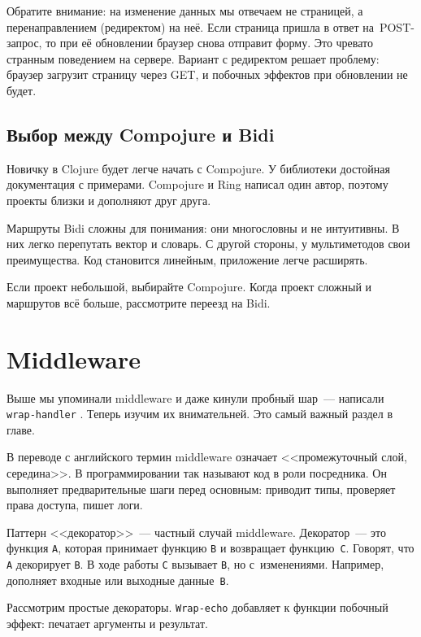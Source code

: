 Обратите внимание: на изменение данных мы отвечаем не страницей, а
перенаправлением (редиректом) на неё. Если страница пришла в ответ
на~POST-запрос, то при её обновлении браузер снова отправит форму. Это чревато
странным поведением на сервере. Вариант с редиректом решает проблему: браузер
загрузит страницу через GET, и побочных эффектов при обновлении не будет.

\subsection{Выбор между Compojure и Bidi}

Новичку в Clojure будет легче начать с Compojure. У библиотеки достойная
документация с примерами. Compojure и Ring написал один автор, поэтому проекты
близки и дополняют друг друга.

Маршруты Bidi сложны для понимания: они многословны и не интуитивны. В них легко
перепутать вектор и словарь. С другой стороны, у мультиметодов свои
преимущества. Код становится линейным, приложение легче расширять.

Если проект небольшой, выбирайте Compojure. Когда проект сложный и маршрутов всё
больше, рассмотрите переезд на Bidi.

\section{Middleware}


Выше мы упоминали middleware и даже кинули пробный шар~--- написали
\verb|wrap-handler| . Теперь изучим их внимательней. Это
самый важный раздел в главе.

В переводе с английского термин middleware означает <<промежуточный слой,
середина>>. В программировании так называют код в роли посредника. Он выполняет
предварительные шаги перед основным: приводит типы, проверяет права доступа,
пишет логи.

\label{decorator}


Паттерн <<декоратор>>~--- частный случай middleware. Декоратор~--- это функция
\verb|А|, которая принимает функцию \verb|B| и возвращает
функцию~\verb|C|. Говорят, что \verb|A| декорирует \verb|B|. В ходе работы
\verb|C| вызывает \verb|B|, но с~изменениями. Например, дополняет входные
или выходные данные~\verb|B|.

Рассмотрим простые декораторы. \verb|Wrap-echo| добавляет к функции побочный
эффект: печатает аргументы и результат.

